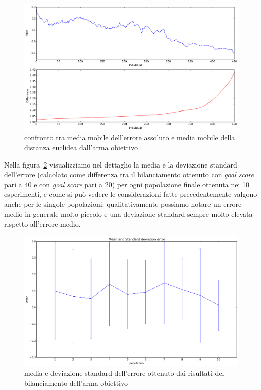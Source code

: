 \documentclass[12pt, italian]{toptesi}
\begin{document}
\begin{figure}[htp]
\centering
\includegraphics[width=1.0\textwidth]{error_vs_distance}
\caption{confronto tra media mobile dell'errore assoluto e media mobile della distanza euclidea dall'arma obiettivo}
\label{fig:error_vs_distance}
\end{figure}

Nella figura~\ref{fig:error_single_weap} visualizziamo nel dettaglio la media e la deviazione standard dell'errore (calcolato come differenza tra il bilanciamento ottenuto con \emph{goal score} pari a 40 e con \emph{goal score} pari a 20) per ogni popolazione finale ottenuta nei 10 esperimenti, e come si può vedere le considerazioni fatte precedentemente valgono anche per le singole popolazioni: qualitativamente possiamo notare un errore medio in generale molto piccolo e una deviazione standard sempre molto elevata rispetto all'errore medio.
\begin{figure}[htp]
\centering
\includegraphics[width=1.0\textwidth]{error_single_weap}
\caption{media e deviazione standard dell'errore ottenuto dai risultati del bilanciamento dell'arma obiettivo}
\label{fig:error_single_weap}
\end{figure}
\end{document}
